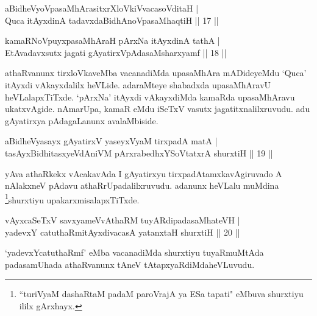 
\begin{shl}
aBidheVyoVpasaMhArasitxrXloVkiVvacasoVditaH | \\
Quca itAyxdinA tadavxdaBidhAnoVpasaMhaqtiH \hfill ||  17 || 
\end{shl}

\begin{shl}
kamaRNoV\s puyxpasaMhAraH pArxNa itAyxdinA tathA | \\
EtAvadavxsutx jagati gAyatirxVpAdasaMsharxyamf \hfill ||  18 || 
\end{shl}

\begin{artha} 
athaRvanunx tirxloVkaveMba vacanadiMda upasaMhAra mADideyeMdu `Quca' 
itAyxdi vAkayxdalilx heVLide. adaraMteye shabadxda upasaMhAravU 
heVLalapxTiTxde. `pArxNa' itAyxdi vAkayxdiMda kamaRda upasaMhAravu 
ukatxvAgide. nAmarUpa, kamaR eMdu iSeTxV vasutx jagatitxnalilxruvudu. 
adu gAyatirxya pAdagaLanunx avalaMbiside.
\end{artha}


\begin{shl}
aBidheVyasayx gAyatirxV yaseyxVyaM tirxpadA matA | \\
tasAyxBidhitasxyeVdAniVM pArxrabedhxYSoVtatxrA shurxtiH \hfill ||  19 || 
\end{shl}

\begin{artha} 
yAva athaRkekx vAcakavAda I gAyatirxyu tirxpadAtamxkavAgiruvado A 
nAlakxneV pAdavu athaRrUpadalilxruvudu. adanunx heVLalu muMdina 
\footnote{``turiVyaM dashaRtaM padaM paroVrajA ya ESa tapati" 
eMbuva shurxtiyu ililx gArxhayx.}shurxtiyu upakarxmisalapxTiTxde.
\end{artha}


\begin{shl}
vAyxcaSeTxV savxyameVvAthaRM tuyARdipadasaMhateVH | \\
yadevxY catuthaRmitAyxdivacasA yatanxtaH shurxtiH \hfill ||  20 || 
\end{shl}

\begin{artha} 
`yadevxYcatuthaRmf' eMba vacanadiMda shurxtiyu tuyaR\break muMtAda 
padasamUhada athaRvanunx tAneV tAtapxyaRdiMda\break heVLuvudu.
\end{artha}

